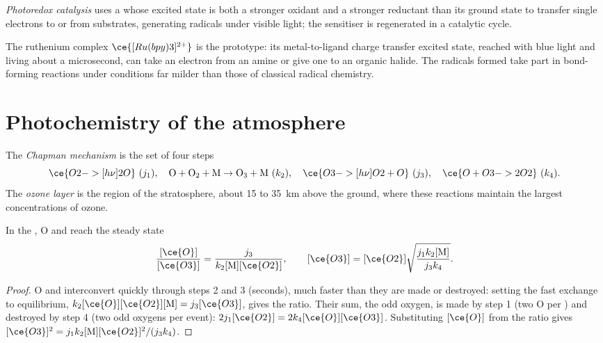 \begin{definition}\label{def:b3:photochemistry:photoredox}
\emph{Photoredox catalysis} uses a 
whose excited state is both a stronger oxidant and a stronger reductant than its
ground state to transfer single electrons to or from substrates, generating
radicals under visible light; the sensitiser is regenerated in a catalytic
cycle.
\end{definition}

The ruthenium complex $\ce{[Ru(bpy)3]^{2+}}$ is the prototype: its metal-to-ligand charge
transfer excited state, reached with blue light and living about a
microsecond, can take an electron from an amine or give one to an organic
halide. The radicals formed take part in bond-forming reactions under
conditions far milder than those of classical radical chemistry.

\section{Photochemistry of the atmosphere}

\begin{definition}\label{def:b3:photochemistry:chapman}
The \emph{Chapman mechanism} is the set of four steps
\[
  \ce{O2 ->[h\nu] 2 O}\ (j_1), \quad \mathrm{O + O_2 + M \to O_3 + M}\ (k_2), \quad
  \ce{O3 ->[h\nu] O2 + O}\ (j_3), \quad \ce{O + O3 -> 2 O2}\ (k_4).
\]
The \emph{ozone layer} is the region of the stratosphere, about
15 to \qty{35}{km} above the ground, where these reactions maintain the largest
concentrations of ozone.
\end{definition}

\begin{theorem}\label{thm:b3:photochemistry:chapman}
In the , O and  reach the steady state
\[
  \frac{[\ce{O}]}{[\ce{O3}]} = \frac{j_3}{k_2[\mathrm M][\ce{O2}]}, \qquad
  [\ce{O3}] = [\ce{O2}]\sqrt{\frac{j_1k_2[\mathrm M]}{j_3k_4}} .
\]
\end{theorem}

\begin{proof}
O and  interconvert quickly through steps 2 and 3 (seconds), much faster
than they are made or destroyed: setting the fast exchange to equilibrium,
$k_2[\ce{O}][\ce{O2}][\mathrm M] = j_3[\ce{O3}]$, gives the ratio. Their sum, the odd oxygen, is made by
step 1 (two O per ) and destroyed by step 4 (two odd oxygens per event):
$2j_1[\ce{O2}] = 2k_4[\ce{O}][\ce{O3}]$. Substituting $[\ce{O}]$ from the ratio gives $[\ce{O3}]^2 = j_1k_2[\mathrm M][\ce{O2}]^2/(j_3k_4)$.
\end{proof}

